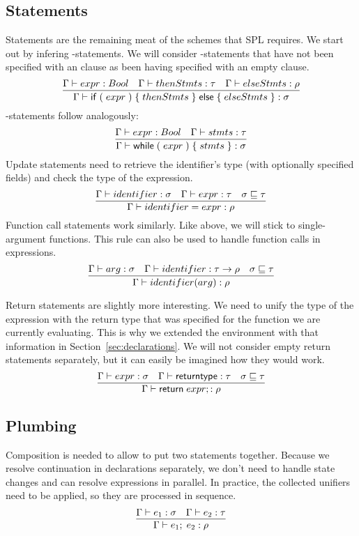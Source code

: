 \subsection{Statements}

Statements are the remaining meat of the schemes that SPL requires.
We start out by infering -statements.
We will consider -statements that have not been specified with an  clause as been having specified with an empty  clause.
\[
    \infer{\Gamma \vdash \mathsf{if}\; (\; expr\;)\; \{\; thenStmts\; \}\;
    \mathsf{else}\; \{\; elseStmts\; \} : \sigma}{
            \Gamma \vdash expr : Bool &
            \Gamma \vdash thenStmts : \tau &
            \Gamma \vdash elseStmts : \rho
    }
\]
-statements follow analogously:
\[
    \infer{\Gamma \vdash \mathsf{while}\; (\; expr\;)\; \{\; stmts\; \}: \sigma}{
            \Gamma \vdash expr : Bool &
            \Gamma \vdash stmts : \tau
    }
\]
Update statements need to retrieve the identifier's type (with optionally specified fields) and check the type of the expression.
\[
    \infer{\Gamma \vdash identifier = expr : \rho}{
        \Gamma \vdash identifier : \sigma &
        \Gamma \vdash expr : \tau &
        \sigma \sqsubseteq \tau
    }
\]
Function call statements work similarly.
Like above, we will stick to single-argument functions.
This rule can also be used to handle function calls in expressions.
\[
    \infer{\Gamma \vdash identifier(arg) : \rho}{
        \Gamma \vdash arg : \sigma &
        \Gamma \vdash identifier : \tau \to \rho &
        \sigma \sqsubseteq \tau
    }
\]

Return statements are slightly more interesting.
We need to unify the type of the expression with the return type that was specified for the function we are currently evaluating.
This is why we extended the environment with that information in Section~\ref{sec:declarations}.
We will not consider empty return statements separately, but it can easily be imagined how they would work.
\[
    \infer{\Gamma \vdash \mathsf{return}\; expr; : \rho}{
        \Gamma \vdash expr : \sigma &
        \Gamma \vdash \mathsf{returntype} : \tau &
        \sigma \sqsubseteq \tau
    }
\]

\subsection{Plumbing}

Composition is needed to allow to put two statements together.
Because we resolve continuation in declarations separately, we don't need to handle state changes and can resolve expressions in parallel.
In practice, the collected unifiers need to be applied, so they are processed in sequence.
\[
    \infer{\Gamma \vdash e_1;\;e_2 : \rho}{
        \Gamma \vdash e_1 : \sigma &
        \Gamma \vdash e_2 : \tau
    }
\]


